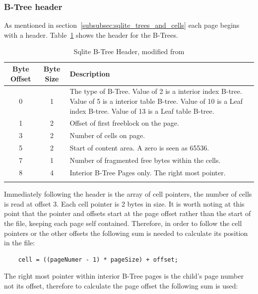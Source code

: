 \subsubsection{B-Tree header}
\label{subsubsec:btree_header}

As mentioned in section~\ref{subsubsec:sqlite_trees_and_cells} each page begins with a header. Table~\ref{tbl:btree_header} shows the header for the B-Trees.

\begin{longtable}[h]{| c | c | p{10cm} |}
		\hline
			\textbf{Byte Offset} & \textbf{Byte Size} & \textbf{Description} \\ 
		\hline
		\endhead
			0 & 1 & The type of B-Tree. \newline
			Value of 2 is a interior index B-tree. \newline
			Value of 5 is a interior table B-tree. \newline
			Value of 10 is a Leaf index B-tree. \newline
			Value of 13 is a Leaf table B-tree. \\
		\hline
			1 & 2 & Offset of first freeblock on the page. \\
		\hline
			3 & 2 & Number of cells on page. \\
		\hline
			5 & 2 & Start of content area. A zero is seen as 65536. \\
		\hline
			7 & 1 & Number of fragmented free bytes within the cells. \\
		\hline
			8 & 4 & Interior B-Tree Pages only. The right most pointer. \\ 
		\hline
	\caption{Sqlite B-Tree Header, modified from \cite{sqlite}}
	\label{tbl:btree_header}
\end{longtable}

Immediately following the header is the array of cell pointers, the number of cells is read at offset 3. Each cell pointer is 2 bytes in size. It is worth noting at this point that the pointer and offsets start at the page offset rather than the start of the file, keeping each page self contained. Therefore, in order to follow the cell pointers or the other offsets the following sum is needed to calculate its position in the file: 

\begin{lstlisting}	
	cell = ((pageNumer - 1) * pageSize) + offset;
\end{lstlisting}

The right most pointer within interior B-Tree pages is the child’s page number not its offset, therefore to calculate the page offset the following sum is used:

